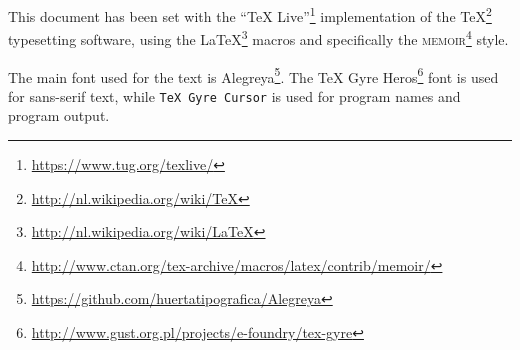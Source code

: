 \documentclass[a4paper,landscape,oneside,11pt,twocolumn]{memoir}
\begin{document}
This document has been set with the “TeX
Live”\footnote{\url{https://www.tug.org/texlive/}} implementation of the
\TeX\footnote{\url{http://nl.wikipedia.org/wiki/TeX}} typesetting software,
using the \LaTeX\footnote{\url{http://nl.wikipedia.org/wiki/LaTeX}} macros and
specifically the \textsc{memoir}\footnote{%
    \url{http://www.ctan.org/tex-archive/macros/latex/contrib/memoir/}} style.

The main font used for the text is
Alegreya\footnote{\url{https://github.com/huertatipografica/Alegreya}}.  The
\textsf{TeX Gyre
Heros}\footnote{\url{http://www.gust.org.pl/projects/e-foundry/tex-gyre}} font
is used for sans-serif text, while \texttt{TeX Gyre Cursor} is used for
program names and program output.
\end{document}
